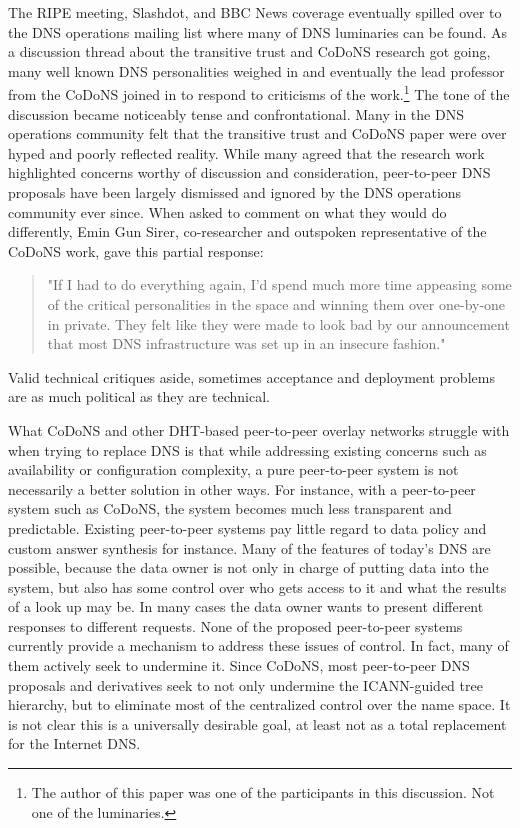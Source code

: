 \documentclass[sigconf]{acmart}
\begin{document}
The RIPE meeting, Slashdot, and BBC News coverage eventually spilled
over to the DNS operations mailing list where many of DNS luminaries can
be found.  As a discussion thread about the transitive trust and CoDoNS
research got going, many well known DNS personalities weighed in and
eventually the lead professor from the CoDoNS joined in to respond to
criticisms of the work.\cite{various_dns-operations_2006}\footnote{The
author of this paper was one of the participants in this discussion.
Not one of the luminaries.}  The tone of the discussion became noticeably
tense and confrontational.  Many in the DNS operations community felt
that the transitive trust and CoDoNS paper were over hyped and poorly
reflected reality.  While many agreed that the research work highlighted
concerns worthy of discussion and consideration, peer-to-peer DNS
proposals have been largely dismissed and ignored by the DNS operations
community ever since.  When asked to comment on what they would do
differently, Emin Gun Sirer, co-researcher and outspoken representative
of the CoDoNS work, gave this partial response:

\begin{quote}
"If I had to do everything again, I'd spend much more time appeasing some
of the critical personalities in the space and winning them over one-by-one
in private. They felt like they were made to look bad by our announcement
that most DNS infrastructure was set up in an insecure
fashion."\cite{gun_sirer_codons_2017}

\end{quote}

Valid technical critiques aside, sometimes acceptance and deployment
problems are as much political as they are technical.

What CoDoNS and other DHT-based peer-to-peer overlay networks struggle
with when trying to replace DNS is that while addressing existing
concerns such as availability or configuration complexity, a pure
peer-to-peer system is not necessarily a better solution in other ways.
For instance, with a peer-to-peer system such as CoDoNS, the system
becomes much less transparent and predictable.  Existing peer-to-peer
systems pay little regard to data policy and custom answer synthesis for
instance.  Many of the features of today's DNS are possible, because the
data owner is not only in charge of putting data into the system, but
also has some control over who gets access to it and what the results of
a look up may be.  In many cases the data owner wants to present
different responses to different requests.  None of the proposed
peer-to-peer systems currently provide a mechanism to address these
issues of control.  In fact, many of them actively seek to undermine it.
Since CoDoNS, most peer-to-peer DNS proposals and derivatives seek to
not only undermine the ICANN-guided tree hierarchy, but to eliminate
most of the centralized control over the name space.  It is not clear
this is a universally desirable goal, at least not as a total
replacement for the Internet DNS.
\end{document}

